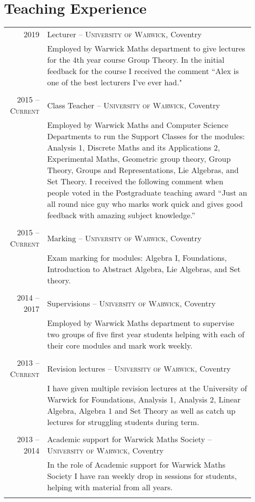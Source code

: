 \documentclass[a4paper,10pt]{article}
\begin{document}
\section{Teaching Experience}
\begin{tabular}{r|p{15cm}}
\textsc{2019} & Lecturer -- \textsc{University of Warwick}, Coventry\\&\footnotesize{Employed by Warwick Maths department to give lectures for the 4th year course Group Theory. In the initial feedback for the course I received the comment ``Alex is one of the best lecturers I've ever had."}\\\multicolumn{2}{c}{} \\
\textsc{2015 -- Current} & Class Teacher -- \textsc{University of Warwick}, Coventry\\&\footnotesize{Employed by Warwick Maths and Computer Science Departments to run the Support Classes for the modules: Analysis 1, Discrete Maths and its Applications 2, Experimental Maths, Geometric group theory, Group Theory, Groups and Representations, Lie Algebras, and Set Theory. I received the following comment when people voted in the Postgraduate teaching award ``Just an all round nice guy who marks work quick and gives good feedback with amazing subject knowledge.”}\\\multicolumn{2}{c}{} \\
\textsc{2015 -- Current}& Marking -- \textsc{University of Warwick}, Coventry\\&\footnotesize{Exam marking for modules: Algebra I, Foundations, Introduction to Abstract Algebra, Lie Algebras, and Set theory.}\\\multicolumn{2}{c}{} \\
\textsc{2014 -- 2017} & Supervisions -- \textsc{University of Warwick}, Coventry\\&\footnotesize{Employed by Warwick Maths department to supervise two groups of five first year students helping with each of their core modules and mark work weekly.}\\\multicolumn{2}{c}{} \\
\textsc{2013 -- Current}& Revision lectures -- \textsc{University of Warwick}, Coventry\\&\footnotesize{I have given multiple revision lectures at the University of Warwick for Foundations, Analysis 1, Analysis 2, Linear Algebra, Algebra 1 and Set Theory as well as catch up lectures for struggling students during term.}\\\multicolumn{2}{c}{} \\
\textsc{2013 -- 2014} & Academic support for Warwick Maths Society -- \textsc{University of Warwick}, Coventry\\&\footnotesize{In the role of Academic support for Warwick Maths Society I have ran weekly drop in sessions for students, helping with material from all years.}\\\multicolumn{2}{c}{} \\
\end{tabular}
\end{document}
